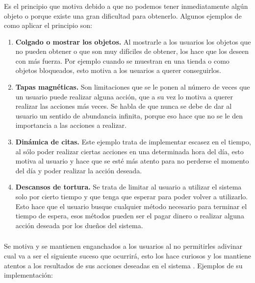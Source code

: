     \subsubsection{\principioVI}
    \label{subsec:principioVI}
        Es el principio que motiva debido a que no podemos tener inmediatamente algún objeto o porque existe una gran dificultad para obtenerlo\cite[p. 233]{libro2}. Algunos ejemplos de como aplicar el principio son:
        
        \begin{enumerate}
            \item \textbf{Colgado o mostrar los objetos.}\cite[p. 252]{libro2} Al mostrarle a los usuarios los objetos que no pueden obtener o que son muy difíciles de obtener, los hace que los deseen con más fuerza. Por ejemplo cuando se muestran en una tienda o como objetos bloqueados, esto motiva a los usuarios a querer conseguirlos.
            
            \item \textbf{Tapas magnéticas.}\cite[p. 256]{libro2} Son limitaciones que se le ponen al número de veces que un usuario puede realizar alguna acción, que a su vez lo motiva a querer realizar las acciones más veces. Se habla de que nunca se debe de dar al usuario un sentido de abundancia infinita, porque eso hace que no se le den importancia a las acciones a realizar.
            
            \item \textbf{Dinámica de citas.}\cite[p. 258]{libro2} Este ejemplo trata de implementar escasez en el tiempo, al sólo poder realizar ciertas acciones en una determinada hora del día, esto motiva al usuario y hace que se esté más atento para no perderse el momento del día y poder realizar la acción deseada.
            
            \item \textbf{Descansos de tortura.}\cite[p. 261]{libro2} Se trata de limitar al usuario a utilizar el sistema solo por cierto tiempo y que tenga que esperar para poder volver a utilizarlo. Esto hace que el usuario busque cualquier método necesario para terminar el tiempo de espera, esos métodos pueden ser el pagar dinero o realizar alguna acción deseada por los dueños del sistema.
        \end{enumerate}
    \subsubsection{\principioVII}
    \label{subsec:principioVII}
       Se motiva y se mantienen enganchados a los usuarios al no permitirles adivinar cual va a ser el siguiente suceso que ocurrirá, esto los hace curiosos y los mantiene atentos a los resultados de sus acciones deseadas en el sistema \cite[p. 273]{libro2}. Ejemplos de su implementación:
       
